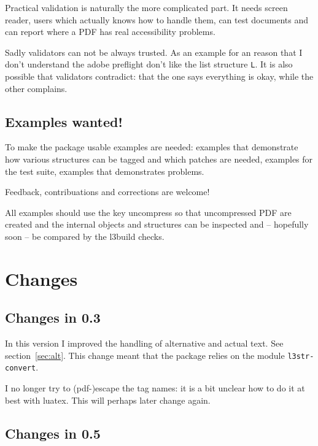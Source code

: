 \documentclass[DIV=12,parskip=half-,bibliography=totoc,a4paper]{article}
\newcommand\PrintKeyName[1]{\textsf{#1}}
\newcommand\PDF{PDF}
\begin{document}
Practical validation is naturally the more complicated part. It needs screen reader, users which actually knows how to handle them, can test documents and can report where a \PDF{} has real accessibility problems.



Sadly validators can not be always trusted. As an example for an reason that I don't understand the adobe preflight don't like the list structure \texttt{L}.
It is also possible that validators contradict: that the one says everything is okay, while the other complains.



\subsection{Examples wanted!}


To make the package usable examples are needed: examples that demonstrate how various structures can be tagged and which patches are needed, examples for the test suite, examples that demonstrates problems.


\begin{tcolorbox}
Feedback, contribuations and corrections are welcome!
\end{tcolorbox}


All examples should use the  key \PrintKeyName{uncompress}
so that uncompressed \PDF{} are created and the internal objects and structures can be inspected and -- hopefully soon -- be compared by the l3build checks.%


\section{Changes}
\subsection{Changes in 0.3}


In this version I improved the handling of alternative and actual text. See section~\ref{sec:alt}. This change meant that the package relies on the module \texttt{l3str-convert}.

I no longer try to (pdf-)escape the tag names: it is a bit unclear how to do it at best with luatex. This will perhaps later change again.


\subsection{Changes in 0.5}
\end{document}
